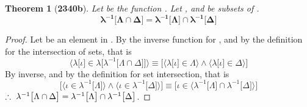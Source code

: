\documentclass[preview]{standalone}
\newtheorem{theorem}{Theorem}
\begin{document}
\begin{theorem}[\textbf{2340b}]
    Let \bm{$\lambda$} be the function 
    . 
    Let \bm{$\Lambda$}, and \bm{$\Delta$} 
    be subsets of . 
    \begin{equation*}
        \bm{
        \lambda ^{-1} \big[ \Lambda \cap \Delta \big] 
            = 
        \lambda ^{-1} 
            \big[ \Lambda \big] 
                \cap 
            \lambda^{-1} \big[ \Delta \big]
        }
    \end{equation*}
\end{theorem}

\begin{proof}
    Let \bm{$\iota$} be an element in .
    By the inverse function for
    , 
    and by the definition for the intersection of sets, that is 
    \begin{equation*}
        \bigg \langle \lambda 
            \big[ \iota \big] 
                \in 
            \lambda \Big[ 
                \lambda ^{-1} \big[ \Lambda \cap \Delta \big]
            \Big]
        \bigg \rangle
            \equiv
        \bigg[
            \Big \langle \lambda \big[ \iota \big] \in \Lambda \Big \rangle
                \land 
            \Big \langle \lambda \big[ \iota \big] \in \Delta \Big \rangle
        \bigg]
    \end{equation*}
    By \bm{$\lambda$} inverse, and by the definition for set intersection, that is
    \begin{equation*}
        \bigg[
            \Big \langle
                \iota \in \lambda^{-1} \big[ \Lambda \big] 
            \Big \rangle
                \land 
            \Big \langle
                \iota \in \lambda^{-1} \big[ \Delta \big]
            \Big \rangle
        \bigg]
            \equiv
        \bigg[ 
            \iota \in \Big \langle
                \lambda ^{-1} \big[ \Lambda \big] 
                    \cap 
                \lambda ^{-1} \big[ \Delta \big]
            \Big \rangle
        \bigg]
    \end{equation*}
    $\therefore \text{\space} \relax{
    \lambda ^{-1} \big[ \Lambda \cap \Delta \big] 
        = 
    \lambda ^{-1} 
        \big[ \Lambda \big] 
            \cap 
        \lambda^{-1} \big[ \Delta \big]
    }$.
\end{proof}
\end{document}
